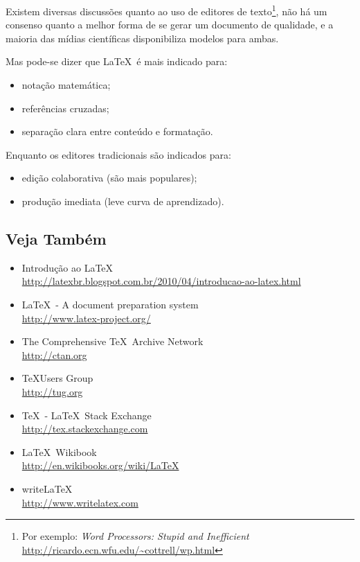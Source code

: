 %

Existem diversas discussões quanto ao uso de editores de texto\footnote{Por exemplo: 
\emph{Word Processors: Stupid and Inefficient} \url{http://ricardo.ecn.wfu.edu/~cottrell/wp.html}},
não há um consenso quanto a melhor forma de se gerar um documento de qualidade, 
e a maioria das mídias científicas disponibiliza modelos para ambas.

Mas pode-se dizer que \LaTeX\ é mais indicado para:
\begin{itemize}
	\item notação matemática;
	\item referências cruzadas;
	\item separação clara entre conteúdo e formatação.
\end{itemize}

Enquanto os editores tradicionais são indicados para:
\begin{itemize}
	\item edição colaborativa (são mais populares);
	\item produção imediata (leve curva de aprendizado).
\end{itemize}

\subsection{Veja Também}
\begin{itemize}
	\item Introdução ao \LaTeX
		\\\url{http://latexbr.blogspot.com.br/2010/04/introducao-ao-latex.html}
	\item \LaTeX\ - A document preparation system
		\\\url{http://www.latex-project.org/}
	\item The Comprehensive \TeX\ Archive Network
		\\\url{http://ctan.org}
	\item \TeX Users Group
		\\\url{http://tug.org}
	\item \TeX\ - \LaTeX\ Stack Exchange
		\\\url{http://tex.stackexchange.com}
	\item \LaTeX\ Wikibook
		\\\url{http://en.wikibooks.org/wiki/LaTeX}
	\item write\LaTeX
		\\\url{http://www.writelatex.com}
\end{itemize}



